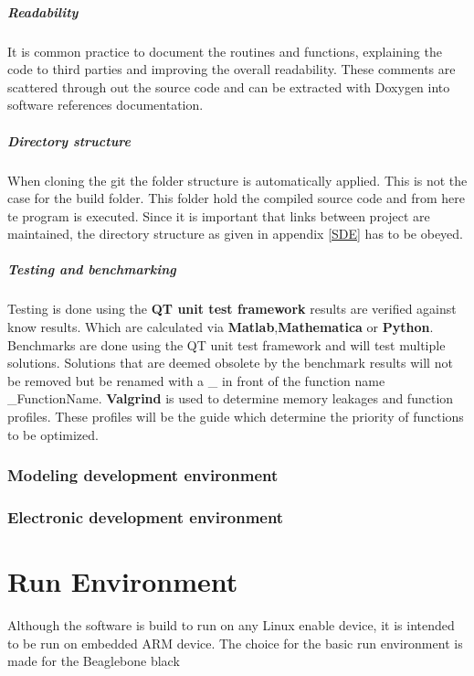 \documentclass[11pt,fleqn,,a4paper,twoside,openright]{book}
\begin{document}
\paragraph{Readability}
It is common practice to document the routines and functions, explaining the code to third parties and improving the overall readability. These comments are scattered through out the source code and can be extracted with Doxygen into software references documentation.

\paragraph{Directory structure}
When cloning the git the folder structure is automatically applied. This is not the case for the build folder. This folder hold the compiled source code and from here te program is executed. Since it is important that links between project are maintained, the directory structure as given in appendix \ref{SDE} has to be obeyed.

\paragraph{Testing and benchmarking}
Testing is done using the \textbf{QT unit test framework} results are verified against know results. Which are calculated via \textbf{Matlab},\textbf{Mathematica} or \textbf{Python}. Benchmarks are done using the QT unit test framework and will test multiple solutions. Solutions that are deemed obsolete by the benchmark results will not be removed but be renamed with a \_ in front of the function name \_FunctionName. \textbf{Valgrind} is used to determine memory leakages and function profiles. These profiles will be the guide which determine the priority of functions to be optimized.

\subsection{Modeling development environment}

\subsection{Electronic development environment}

\chapter{Run Environment}\label{RunEnvironment}
Although the software is build to run on any Linux enable device, it is intended to be run on embedded ARM device. The choice for the basic run environment is made for the Beaglebone black
\end{document}
